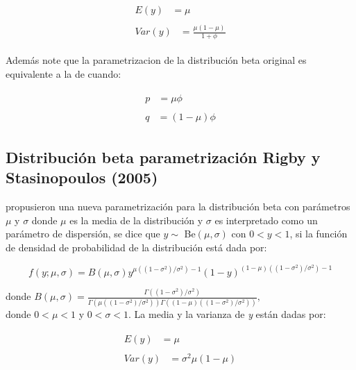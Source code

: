 \begin{align}
\begin{split}
	E(y) &= \mu 
\end{split} \label{E_FC} \\
\begin{split}
	Var(y) &= \frac{\mu(1-\mu)}{1+\phi}
\end{split} \label{V_FC}
\end{align}

Adem\'{a}s note que la parametrizacion de la distribuci\'{o}n beta original es equivalente a la de \cite{Ferrari2} cuando:

\begin{align}
\begin{split}
	p &= \mu\phi
\end{split} \label{FC_Origin1} \\
\begin{split}
q &= (1-\mu)\phi
\end{split} \label{FC_Origin2}
\end{align}

\subsection{Distribuci\'{o}n beta parametrizaci\'{o}n Rigby y Stasinopoulos (2005)}

\cite{Stasinopoulos2} propusieron una nueva parametrizaci\'{o}n para la distribuci\'{o}n beta con par\'{a}metros $\mu$ y $\sigma$ donde $\mu$ es la media de la distribuci\'{o}n y $\sigma$ es interpretado como un par\'{a}metro de dispersi\'{o}n, se dice que $y \sim$ Be$(\mu,\sigma)$ con $0<y<1$, si la funci\'{o}n de densidad de probabilidad de la distribuci\'{o}n est\'{a} dada por:

\begin{equation}
f(y;\mu,\sigma)=B(\mu,\sigma)y^{\mu((1-\sigma^2)/\sigma^2)-1}(1-y)^{(1-\mu)((1-\sigma^2)/\sigma^2)-1}
\end{equation}

donde $B(\mu,\sigma)=\frac{\Gamma((1-\sigma^2)/\sigma^2)}{\Gamma(\mu((1-\sigma^2)/\sigma^2))\Gamma((1-\mu)((1-\sigma^2)/\sigma^2))},$\\

donde $0<\mu<1$ y $0<\sigma<1$. La media y la varianza de \textit{y} est\'{a}n dadas por:

\begin{align}
\begin{split}
	E(y) &= \mu 
\end{split} \label{E_RS} \\
\begin{split}
	Var(y) &= \sigma^2\mu(1-\mu)
\end{split} \label{V_RS}
\end{align}

